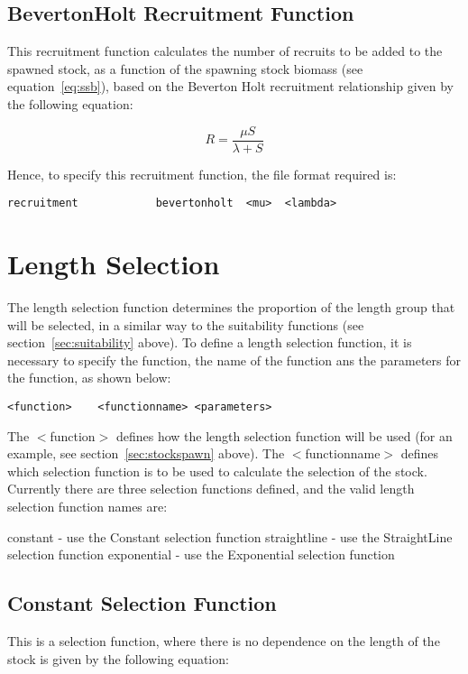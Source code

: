 \documentclass[10pt,twoside]{book}
\begin{document}
\subsection{BevertonHolt Recruitment Function}
This recruitment function calculates the number of recruits to be added to the spawned stock, as a function of the spawning stock biomass (see equation~\ref{eq:ssb}), based on the Beverton Holt recruitment relationship given by the following equation:

\begin{equation}\label{eq:rec4}
R = \frac{\mu S}{\lambda + S}
\end{equation}

Hence, to specify this recruitment function, the file format required is:

{\small\begin{verbatim}
recruitment            bevertonholt  <mu>  <lambda>
\end{verbatim}}

\section{Length Selection}\label{sec:lselection}
The length selection function determines the proportion of the length group that will be selected, in a similar way to the suitability functions (see section~\ref{sec:suitability} above).  To define a length selection function, it is necessary to specify the function, the name of the function ans the parameters for the function, as shown below:

{\small\begin{verbatim}
<function>    <functionname> <parameters>
\end{verbatim}}

The $<$function$>$ defines how the length selection function will be used (for an example, see section~\ref{sec:stockspawn} above).  The $<$functionname$>$ defines which selection function is to be used to calculate the selection of the stock.  Currently there are three selection functions defined, and the valid length selection function names are:

\bigskip
constant - use the Constant selection function\newline
straightline - use the StraightLine selection function\newline
exponential - use the Exponential selection function

\subsection{Constant Selection Function}
This is a selection function, where there is no dependence on the length of the stock is given by the following equation:
\end{document}
